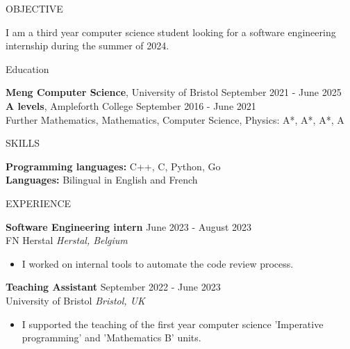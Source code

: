 \documentclass{resume} %
\begin{document}

\begin{rSection}{OBJECTIVE}

{I am a third year computer science student looking for a software engineering internship during the summer of 2024.}


\end{rSection}

\begin{rSection}{Education}

{\bf Meng Computer Science}, University of Bristol \hfill {September 2021 - June 2025} \\

{\bf A levels}, Ampleforth College \hfill {September 2016 - June 2021} \\
Further Mathematics, Mathematics, Computer Science, Physics: A*, A*, A*, A

\end{rSection}

\begin{rSection}{SKILLS}

{\bf Programming languages:} C++, C, Python, Go\\
{\bf Languages:} Bilingual in English and French

\end{rSection}

\begin{rSection}{EXPERIENCE}

\textbf{Software Engineering intern} \hfill June 2023 - August 2023\\
FN Herstal \hfill \textit{Herstal, Belgium}
 \begin{itemize}
    \itemsep -3pt {} 
     \item I worked on internal tools to automate the code review process.
 \end{itemize}

\textbf{Teaching Assistant} \hfill September 2022 - June 2023\\
University of Bristol \hfill \textit{Bristol, UK}
 \begin{itemize}
    \itemsep -3pt {} 
     \item I supported the teaching of the first year computer science 'Imperative programming' and 'Mathematics B' units.
 \end{itemize}
 
\end{rSection} 
\end{document}
